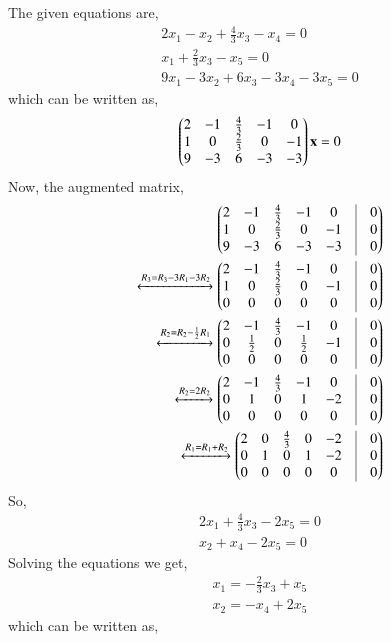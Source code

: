    The given equations are,
   \begin{align}
   2x_1-x_2+\frac{4}{3}x_3-x_4=0\\
   x_1+\frac{2}{3}x_3-x_5=0\\
   9x_1-3x_2+6x_3-3x_4-3x_5=0
   \end{align}
   which can be written as,
   \begin{align}
  \begin{pmatrix}2&-1&\frac{4}{3}&-1&0\\1&0&\frac{2}{3}&0&-1\\9&-3&6&-3&-3\end{pmatrix}\mathbf{x}=0
   \end{align}
   Now, the augmented matrix,
   \begin{align}
     \myvec{2&-1&\frac{4}{3}&-1&0&\vrule&0\\1&0&\frac{2}{3}&0&-1&\vrule& 0\\9&-3&6&-3&-3&\vrule& 0}\\
        \xleftrightarrow{R_3=R_3-3R_1-3R_2}\myvec{2&-1&\frac{4}{3}&-1&0&\vrule&0\\1&0&\frac{2}{3}&0&-1&\vrule& 0\\0&0&0&0&0&\vrule& 0}\\
     \xleftrightarrow{R_2=R_2-\frac{1}{2}R_1}\myvec{2&-1&\frac{4}{3}&-1&0&\vrule&0\\0&\frac{1}{2}&0&\frac{1}{2}&-1&\vrule& 0\\0&0&0&0&0&\vrule& 0}\\
      \xleftrightarrow{R_2=2R_2}\myvec{2&-1&\frac{4}{3}&-1&0&\vrule&0\\0&1&0&1&-2&\vrule& 0\\0&0&0&0&0&\vrule& 0}\\
      \xleftrightarrow{R_1=R_1+R_2}\myvec{2&0&\frac{4}{3}&0&-2&\vrule&0\\0&1&0&1&-2&\vrule& 0\\0&0&0&0&0&\vrule& 0}
\end{align}
So,
\begin{align}
2x_1+\frac{4}{3}x_3-2x_5=0\\
x_2+x_4-2x_5=0
\end{align}
Solving the equations we get,
\begin{align}
x_1=-\frac{2}{3}x_3+x_5\\
x_2=-x_4+2x_5
\end{align}
which can be written as,
